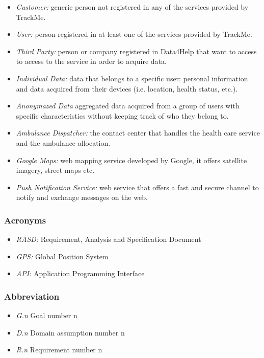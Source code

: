 \documentclass[a4paper]{article}
\begin{document}
    \begin{itemize}
        \item \textit{Customer:} generic person not registered in any of the services provided by TrackMe. 
        \item \textit{User:} person registered in at least one of the services provided by TrackMe.
        \item \textit{Third Party:} person or company registered in Data4Help that want to access to access to the service in order to acquire data.
        \item \textit{Individual Data:} data that belongs to a specific user: personal information and data acquired from their devices (i.e. location, health status, etc.).
        \item \textit{Anonymazed Data} aggregated data acquired from a group of users with specific characteristics without keeping track of who they belong to.
        \item \textit{Ambulance Dispatcher:} the contact center that handles the health care service and the ambulance allocation.
        \item \textit{Google Maps:} web mapping service developed by Google, it offers satellite imagery, street maps etc.
        \item \textit{Push Notification Service:} web service that offers a fast and secure channel to notify and exchange messages on the web.
    \end{itemize}
    
    \subsubsection{Acronyms}
    
    \begin{itemize}
        \item \textit{RASD:} Requirement, Analysis and Specification Document
        \item \textit{GPS:} Global Position System
        \item \textit{API:} Application Programming Interface
    \end{itemize}
    

    \subsubsection{Abbreviation}
    
        \begin{itemize}
        \item \textit{G.n} Goal number n
        \item \textit{D.n} Domain assumption number n
        \item \textit{R.n} Requirement number n
    \end{itemize}
    
\end{document}
